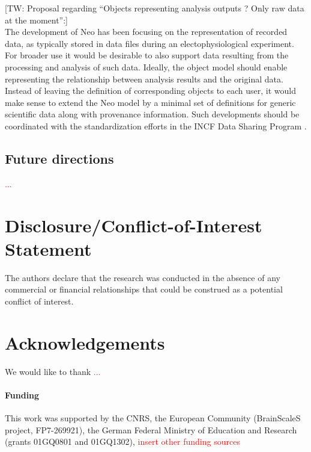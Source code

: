 \documentclass{frontiers}
\newcommand{\missing}[1]{\textcolor{red}{#1}}
\newcommand{\thomas}[1]{[\textcolor{Emerald}{TW: #1}]}
\begin{document}
\thomas{Proposal regarding ``Objects representing analysis outputs ? Only raw data at the moment'':}\\
The development of Neo has been focusing on the representation of recorded data, as typically stored in data files during an electophysiological experiment.
For broader use it would be desirable to also support data resulting from the processing and analysis of such data.
Ideally, the object model should enable representing the relationship between analysis results and the original data.
Instead of leaving the definition of corresponding objects to each user, it would make sense to extend the Neo model by a minimal set of definitions for generic scientific data along with provenance information.
Such developments should be coordinated with the standardization efforts in the INCF Data Sharing Program \citep{Teeters2013}.



\subsection{Future directions}

\missing{...}


\section*{Disclosure/Conflict-of-Interest Statement}
The authors declare that the research was conducted in the absence of any commercial or financial relationships that could be construed as a potential conflict of interest.

\section*{Acknowledgements}
We would like to thank \missing{...}

\paragraph{Funding\textcolon} This work was supported by the CNRS, the European Community (BrainScaleS project, FP7-269921),
the German Federal Ministry of Education and Research (grants 01GQ0801 and 01GQ1302),
\missing{insert other funding sources}



\end{document}
